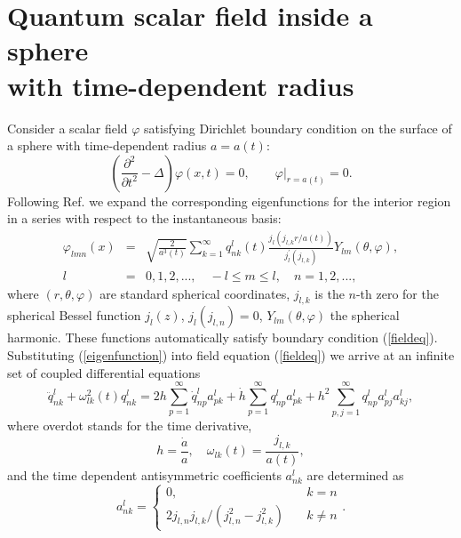 \documentclass[a4paper,11pt]{article}
\begin{document}
\section{Quantum scalar field inside a sphere \\ with time-dependent radius}

Consider a scalar field $\varphi $ satisfying Dirichlet boundary condition
on the surface of a sphere with time-dependent radius $a=a(t)$:
\begin{equation}
\left( \frac{\partial ^{2}}{\partial t^{2}}-\Delta \right) \varphi
(x,t)=0,\qquad \varphi |_{r=a(t)}=0.  \label{fieldeq}
\end{equation}
Following Ref.\cite{set} we expand the corresponding
eigenfunctions for the interior region in a series with respect to
the instantaneous basis:
\begin{eqnarray}
\varphi _{lmn}(x) &=&\sqrt{\frac{2}{a^{3}(t)}}\sum_{k=1}^{\infty
}q_{nk}^{l}(t)\frac{j_{l}(j_{l,k}r/a(t))}{j_{l}^{\prime }(j_{l,k})}%
Y_{lm}(\theta ,\varphi ),  \label{eigenfunction} \\
l &=&0,1,2,...,\quad -l\leq m\leq l,\quad n=1,2,...,
\end{eqnarray}
where $(r,\theta ,\varphi )$ are standard spherical coordinates,  $j_{l,k}$
is the $n$-th zero for the spherical Bessel function $j_{l}(z)$, $%
j_{l}(j_{l,n})=0$, $Y_{lm}(\theta ,\varphi )$ the spherical harmonic.
These functions automatically satisfy boundary condition (\ref{fieldeq}).
Substituting (\ref{eigenfunction}) into field equation (\ref{fieldeq}) we
arrive at an infinite set of coupled differential equations \cite{set}
\begin{equation}
\ddot{q}_{nk}^{l}+\omega _{lk}^{2}(t)q_{nk}^{l}=2h\sum_{p=1}^{\infty }\dot{q}%
_{np}^{l}a_{pk}^{l}+\dot{h}\sum_{p=1}^{\infty
}q_{np}^{l}a_{pk}^{l}+h^{2}\sum_{p,j=1}^{\infty
}q_{np}^{l}a_{pj}^{l}a_{kj}^{l},  \label{eqcoef}
\end{equation}
where overdot stands for the time derivative,
\begin{equation}
h=\frac{\dot{a}}{a},\quad \omega _{lk}(t)=\frac{j_{l,k}}{a(t)},  \label{hom}
\end{equation}
and the time dependent antisymmetric coefficients $a_{nk}^{l}$ are
determined as
\begin{equation}
a_{nk}^{l}=\left\{
\begin{array}{cc}
0, & \quad k=n \\
2j_{l,n}j_{l,k}/(j_{l,n}^{2}-j_{l,k}^{2}) & \quad k\neq n
\end{array}
\right. .  \label{alnk}
\end{equation}
\end{document}
